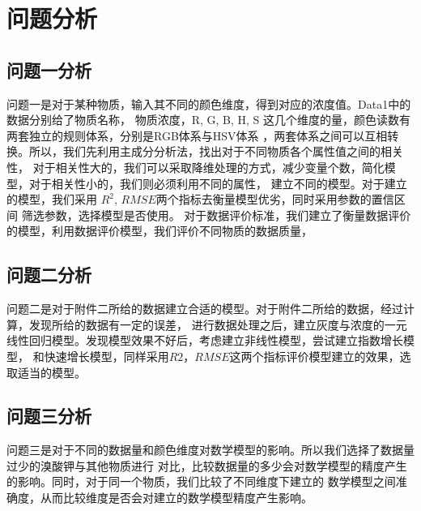 \section{问题分析}
\subsection{问题一分析}
问题一是对于某种物质，输入其不同的颜色维度，得到对应的浓度值。Data1中的数据分别给了物质名称，
物质浓度，R, G, B, H, S 这几个维度的量，颜色读数有两套独立的规则体系，分别是RGB体系与HSV体系
，两套体系之间可以互相转换。所以，我们先利用主成分分析法，找出对于不同物质各个属性值之间的相关性，
对于相关性大的，我们可以采取降维处理的方式，减少变量个数，简化模型，对于相关性小的，我们则必须利用不同的属性，
建立不同的模型。对于建立的模型，我们采用 $R^2$, $RMSE$两个指标去衡量模型优劣，同时采用参数的置信区间
筛选参数，选择模型是否使用。
对于数据评价标准，我们建立了衡量数据评价的模型，利用数据评价模型，我们评价不同物质的数据质量，

\subsection{问题二分析}
问题二是对于附件二所给的数据建立合适的模型。对于附件二所给的数据，经过计算，发现所给的数据有一定的误差，
进行数据处理之后，建立灰度与浓度的一元线性回归模型。发现模型效果不好后，考虑建立非线性模型，尝试建立指数增长模型，
和快速增长模型，同样采用$R2$，$RMSE$这两个指标评价模型建立的效果，选取适当的模型。

\subsection{问题三分析}
问题三是对于不同的数据量和颜色维度对数学模型的影响。所以我们选择了数据量过少的溴酸钾与其他物质进行
对比，比较数据量的多少会对数学模型的精度产生的影响。同时，对于同一个物质，我们比较了不同维度下建立的
数学模型之间准确度，从而比较维度是否会对建立的数学模型精度产生影响。
